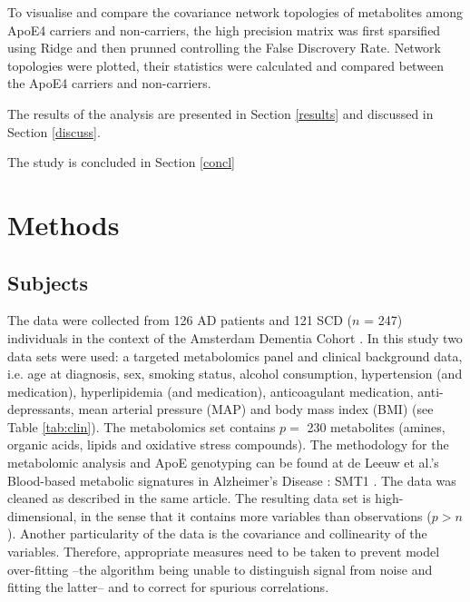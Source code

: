 \documentclass{amsart}
\begin{document}
To visualise and compare the covariance network topologies of metabolites among ApoE4 carriers and non-carriers, the high precision matrix was first sparsified using Ridge and then prunned controlling the False Discrovery Rate. Network topologies were plotted, their statistics were calculated and compared between the ApoE4 carriers and non-carriers.

The results of the analysis are presented in Section \ref{results} and discussed in Section \ref{discuss}.

The study is concluded in Section \ref{concl}


\newpage
\section{Methods}\label{methods}

\subsection{Subjects}\label{subjects}
The data were collected from 126 AD patients and 121 SCD ($n$ = 247) individuals in the context of the Amsterdam Dementia Cohort \cite{VanDerFlier2018AmsterdamCare, deLeeuw2017Blood-basedDisease}. In this study two data sets were used: a targeted metabolomics panel and clinical background data, i.e. age at diagnosis, sex, smoking status, alcohol consumption, hypertension (and medication), hyperlipidemia (and medication), anticoagulant medication, anti-depressants, mean arterial pressure (MAP) and body mass index (BMI) (see Table \ref{tab:clin}). The metabolomics set contains $p =$ 230 metabolites (amines, organic acids, lipids and oxidative stress compounds). The methodology for the metabolomic analysis and ApoE genotyping can be found at de Leeuw et al.'s  Blood-based metabolic signatures in Alzheimer's Disease \cite{deLeeuw2017Blood-basedDisease}: SMT1 . The data was cleaned as described in the same article. The resulting data set is high-dimensional, in the sense that it contains more variables than observations ($p > n$). Another particularity of the data is the covariance and collinearity of the variables. Therefore, appropriate measures need to be taken to prevent model over-fitting --the algorithm being unable to distinguish signal from noise and fitting the latter--  and to correct for spurious correlations.
\end{document}

